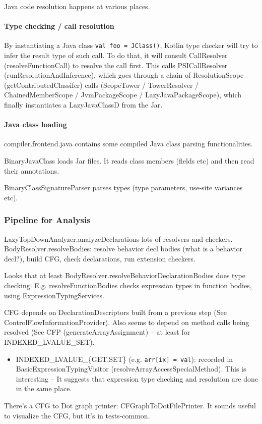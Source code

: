 \documentclass{article}
\begin{document}
Java code resolution happens at various places.

\paragraph{Type checking / call resolution}
By instantiating a Java class \texttt{val foo = JClass()}, Kotlin type checker will try to infer the result type of such call. To do that, it will consult CallResolver (resolveFunctionCall) to resolve the call first. This calls PSICallResolver (runResolutionAndInference), which goes through a chain of ResolutionScope (getContributedClassifer) calls (ScopeTower / TowerResolver / ChainedMemberScope / JvmPackageScope / LazyJavaPackageScope), which finally instantiates a LazyJavaClassD from the Jar.

\paragraph{Java class loading}

compiler.frontend.java contains some compiled Java class parsing functionalities.

BinaryJavaClass loads Jar files. It reads class members (fields etc) and then read their annotations.

BinaryClassSignatureParser parses types (type parameters, use-site variances etc).

\subsubsection{Pipeline for Analysis}

LazyTopDownAnalyzer.analyzeDeclarations \textSafeTo lots of resolvers and checkers.
BodyResolver.resolveBodies: resolve behavior decl bodies (what is a behavior decl?), build CFG, check declarations, run extension checkers.

Looks that at least BodyResolver.resolveBehaviorDeclarationBodies does type checking. E.g. resolveFunctionBodies checks expression types in function bodies, using ExpressionTypingServices.

CFG depends on DeclarationDescriptors built from a previous step (See ControlFlowInformationProvider). Also seems to depend on method calls being resolved (See CFP (generateArrayAssignment) -- at least for INDEXED\_LVALUE\_SET).

\begin{itemize}
    \item INDEXED\_LVALUE\_\{GET,SET\} (e.g. \texttt{arr[ix] = val}): recorded in BasicExpressionTypingVisitor (resolveArrayAccessSpecialMethod). This is interesting -- It suggests that expression type checking and resolution are done in the same place.
\end{itemize}

There's a CFG to Dot graph printer: CFGraphToDotFilePrinter. It sounds useful to visualize the CFG, but it's in tests-common.


\newpage
\printnomenclature
\end{document}
